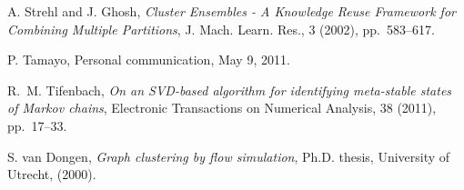 \documentclass[final]{siamltex}
\begin{document}
\begin{thebibliography}{99}
 {\sc A. Strehl and J. Ghosh}, {\em Cluster Ensembles - A Knowledge Reuse Framework for Combining Multiple Partitions}, J. Mach. Learn. Res., 3 (2002), pp.~583--617.

 {\sc P. Tamayo}, {Personal communication}, May 9, 2011.

 {\sc R.~M. Tifenbach}, {\em On an SVD-based algorithm for identifying meta-stable states of Markov chains}, Electronic Transactions on Numerical Analysis, 38 (2011), pp.~17--33.

 {\sc S. van Dongen}, {\em Graph clustering by flow simulation}, Ph.D. thesis, University of Utrecht, (2000).

\end{thebibliography} 
\end{document}

